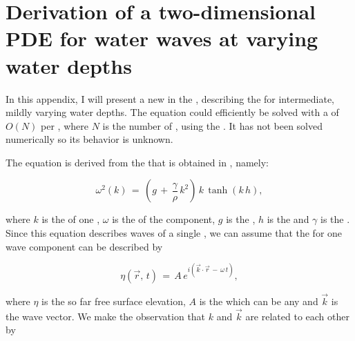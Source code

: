 \chapter{Derivation of a two-dimensional PDE for water waves at varying water depths}
\label{chap:pde_derivation}

In this appendix, I will present a new   \PDE in the , describing the  for intermediate, mildly varying water depths. The equation could efficiently be solved with a  of $O(N)$ per , where $N$ is the number of , using the \CFMM \citep{White1994}. It has not been solved numerically so its behavior is unknown.

The equation is derived from the  that is obtained in  \citep{temp}, namely:

\begin{equation} \label{eq:dispersion}
\omega^2(k) \,=\, \left(g\,+\,\frac{\gamma}{\rho}\,k^2\right)\,k\,\tanh(k\,h),
\end{equation}

where $k$ is the  of one , $\omega$ is the  of the component, $g$ is the , $h$ is the  and $\gamma$ is the . Since this equation describes waves of a single , we can assume that the  for one wave component can be described by

\begin{equation} \label{eq:component}
\eta(\vec{r},\,t) \,=\, A\,e^{i(\vec{k}\cdot\vec{r}\,-\,\omega\,t)},
\end{equation}

where $\eta$ is the so far  free surface elevation, $A$ is the  which can be any  and $\vec{k}$ is the wave vector. We make the observation that $k$ and $\vec{k}$ are related to each other by

